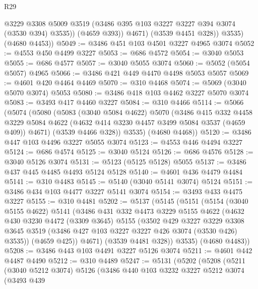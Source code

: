 \begin{lexlean}{R29}
\begin{coremodule}
                @3229
                @3308
                @5009
                @3519
                (@3486 @395 @103 @3227 @3227 @394 @3074 (@3530 @394) @3535))
              (@4659 @393))
            @4671)
          (@3539 @4451 @328))
        @3535)
      (@4680 @4453))
@5049 := @3486 @451 @103 @4501 @3227 @4965 @3074
@5052 := @4553 @450 @4499 @3227
@5053 := @686 @4572
@5054 := @3040 @5053
@5055 := @686 @4577
@5057 := @3040 @5055 @3074
@5060 := @5052 (@5054 @5057) @4965
@5066 := @3486 @421 @449 @4470 @4498 @5053 @5057
@5069 := @4601 @420 @4464 @4469
@5070 := @310 @4468
@5074 := @5069 (@3040 @5070 @3074) @5053
@5080 := @3486 @418 @103 @4462 @3227 @5070 @3074
@5083 := @3493 @417 @4460 @3227
@5084 := @310 @4466
@5114 := @5066
    (@5074
      (@5080
        (@5083
          (@3040 @5084 @4622)
          @5070
          (@3486
            @415
            @332
            @4458
            @3229
            @5084
            @4622
            (@4632 @414 @3230 @4457 @3499 @5084 @3537 (@4659 @409))
            @4671)
          (@3539 @4466 @328))
        @3535)
      (@4680 @4468))
@5120 := @3486 @447 @103 @4496 @3227 @5055 @3074
@5123 := @4553 @446 @4494 @3227
@5124 := @686 @4574
@5125 := @3040 @5124
@5126 := @686 @4576
@5128 := @3040 @5126 @3074
@5131 := @5123 (@5125 @5128) @5055
@5137 := @3486 @437 @445 @4485 @4493 @5124 @5128
@5140 := @4601 @436 @4479 @4484
@5141 := @310 @4483
@5145 := @5140 (@3040 @5141 @3074) @5124
@5151 := @3486 @434 @103 @4477 @3227 @5141 @3074
@5154 := @3493 @433 @4475 @3227
@5155 := @310 @4481
@5202 := @5137
    (@5145
      (@5151
        (@5154
          (@3040 @5155 @4622)
          @5141
          (@3486
            @431
            @332
            @4473
            @3229
            @5155
            @4622
            (@4632
              @430
              @3230
              @4472
              (@3309 @3645)
              @5155
              (@3502
                @429
                @3227
                @3229
                @3308
                @3645
                @3519
                (@3486 @427 @103 @3227 @3227 @426 @3074 (@3530 @426) @3535))
              (@4659 @425))
            @4671)
          (@3539 @4481 @328))
        @3535)
      (@4680 @4483))
@5208 := @3486 @443 @103 @4491 @3227 @5126 @3074
@5211 := @4601 @442 @4487 @4490
@5212 := @310 @4489
@5247 := @5131
    (@5202
      (@5208
        (@5211
          (@3040 @5212 @3074)
          @5126
          (@3486
            @440
            @103
            @3232
            @3227
            @5212
            @3074
            (@3493
              @439

\end{coremodule}
\end{lexlean}
